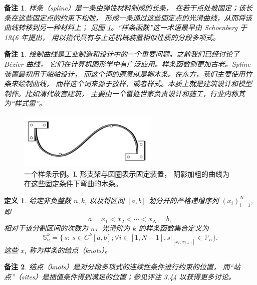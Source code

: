 \documentclass[a4paper]{ctexart}
\newtheorem{remark}{备注}
\newtheorem*{remark*}{备注}
\newtheorem{definition}[theorem]{定义} %
\numberwithin{theorem}{section}
\numberwithin{equation}{section}
\numberwithin{figure}{section}
\numberwithin{remark}{section}
\begin{document}
\begin{remark}
样条（spline）是一条由弹性材料制成的长条，
在若干点处被固定；该长条在这些固定点的约束下松弛，
形成一条通过这些固定点的光滑曲线，从而将该曲线转移到另一种材料上；
见图 \ref{fig::spline_example}。“样条函数”这一术语最早由 Schoenberg 于 1946 年提出，
用以指代具有与上述机械装置相似性质的分段多项式。
\end{remark}

\begin{remark*}
    绘制曲线是工业制造和设计中的一个重要问题。之前我们已经讨论了 Bézier 曲线，
它们在计算机图形学中有广泛应用。样条函数则更加古老。Spline 装置最初用于船舶设计，
而这个词的原意就是柳木条。在东方，我们主要使用竹条来绘制曲线，
而样这个词来源于放样，或者样式。本质上就是建筑设计和模型制作。比如清代故宫建筑，
主要由一个雷姓世家负责设计和施工，行业内称其为“样式雷”。
\end{remark*}

\begin{figure}
\centering
\includegraphics[width=0.6\textwidth]{images/spline.png}
\caption{一个样条示例。L 形支架与圆圈表示固定装置，
阴影加粗的曲线为在这些固定条件下弯曲的木条。}
\label{fig::spline_example}
\end{figure}

\begin{definition}
    \label{def::spline_space}
给定非负整数 $n,k$, 以及将区间 $[a,b]$ 划分开的严格递增序列 $(x_i)_{i=1}^{N}$, 
即
\begin{equation}
    \label{eq::partition}
a=x_1<x_2<\cdots<x_N=b,
\end{equation}
相对于该分割区间的次数为 $n$、光滑阶为 $k$ 的样条函数集合定义为
\begin{equation}
    \label{eq::spline_space}
\mathbb{S}_n^{k}
=\bigl\{\, s:\ s\in C^{k}[a,b]; 
\forall i\in[1,N-1], s\big|_{[x_i,x_{i+1}]}\in\mathbb{P}_{n} 
\bigr\}.
\end{equation}
这些 $x_i$ 称为样条的结点（knots）。
\end{definition}

\begin{remark}
结点（knots）是对分段多项式的连续性条件进行约束的位置，
而“站点”（sites）是插值条件得到满足的位置；参见评注 3.44 
以获得更多讨论。
\end{remark}
\end{document}
